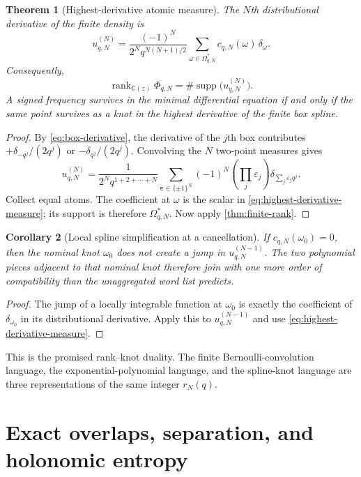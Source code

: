 \documentclass[11pt]{article}
\numberwithin{equation}{section}
\newtheorem{theorem}{Theorem}[section]
\newtheorem{corollary}[theorem]{Corollary}
\theoremstyle{definition}
\theoremstyle{remark}
\DeclareMathOperator{\supp}{supp}
\DeclareMathOperator{\rank}{rank}
\newcommand{\C}{\mathbb C}
\newcommand{\eps}{\varepsilon}
\begin{document}
\begin{theorem}[Highest-derivative atomic measure]
\label{thm:rank-knot}
The $N$th distributional derivative of the finite density is
\begin{equation}
 u_{q,N}^{(N)}=
 \frac{(-1)^N}{2^Nq^{N(N+1)/2}}
 \sum_{\omega\in\Omega^*_{q,N}}c_{q,N}(\omega)\,\delta_\omega.
 \label{eq:highest-derivative-measure}
\end{equation}
Consequently,
\begin{equation}
 \boxed{
 \rank_{\C(z)}\Phi_{q,N}
 =\#\supp\bigl(u_{q,N}^{(N)}\bigr).}
 \label{eq:rank-knot-box}
\end{equation}
A signed frequency survives in the minimal differential equation if and only if
the same point survives as a knot in the highest derivative of the finite box
spline.
\end{theorem}
\begin{proof}
By \eqref{eq:box-derivative}, the derivative of the $j$th box contributes
$+\delta_{-q^j}/(2q^j)$ or $-\delta_{q^j}/(2q^j)$.  Convolving the $N$ two-point
measures gives
\[
 u_{q,N}^{(N)}=
 \frac{1}{2^Nq^{1+2+\cdots+N}}
 \sum_{\bm\eps\in\{\pm1\}^N}
 (-1)^N\left(\prod_j\eps_j\right)
 \delta_{\sum_j\eps_jq^j}.
\]
Collect equal atoms.  The coefficient at $\omega$ is the scalar in
\eqref{eq:highest-derivative-measure}; its support is therefore
$\Omega^*_{q,N}$.  Now apply \cref{thm:finite-rank}.
\end{proof}

\begin{corollary}[Local spline simplification at a cancellation]
\label{cor:spline-cancellation}
If $c_{q,N}(\omega_0)=0$, then the nominal knot $\omega_0$ does not create a
jump in $u_{q,N}^{(N-1)}$.  The two polynomial pieces adjacent to that nominal
knot therefore join with one more order of compatibility than the unaggregated
word list predicts.
\end{corollary}
\begin{proof}
The jump of a locally integrable function at $\omega_0$ is exactly the
coefficient of $\delta_{\omega_0}$ in its distributional derivative.  Apply
this to $u_{q,N}^{(N-1)}$ and use \eqref{eq:highest-derivative-measure}.
\end{proof}

This is the promised rank--knot duality.  The finite Bernoulli-convolution
language, the exponential-polynomial language, and the spline-knot language
are three representations of the same integer $r_N(q)$.

\section{Exact overlaps, separation, and holonomic entropy}
\label{sec:overlap}
\end{document}
